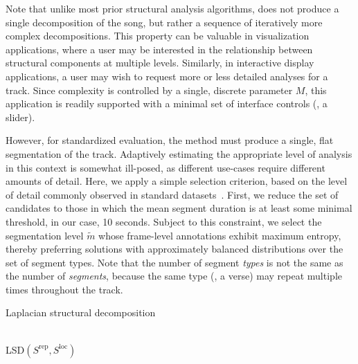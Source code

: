 \documentclass{article}
\begin{document}
Note that unlike most prior structural analysis algorithms,  does not produce a
single decomposition of the song, but rather a sequence of iteratively more complex 
decompositions.  This property can be valuable in visualization applications,
where a user may be interested in the relationship between structural components at
multiple levels.  Similarly, in interactive display applications, a user may wish to 
request more or less detailed analyses for a track.  Since complexity is controlled by
a single, discrete parameter $M$, this application is readily supported with a minimal
set of interface controls (\eg, a slider).

However, for standardized evaluation, the method must produce a single, flat
segmentation of the track.  Adaptively estimating the appropriate level of analysis in
this context is somewhat ill-posed, as different use-cases require different amounts of 
detail.  Here, we apply a simple selection criterion, based on the level of detail
commonly observed in standard datasets~\cite{harte2010towards,smith2011design}.  
First, we reduce the set of candidates to those in which the mean segment duration is 
at least some minimal threshold, in our case, 10 seconds.  
Subject to this constraint, we select the segmentation level $\tilde{m}$ whose 
frame-level annotations exhibit maximum entropy, thereby preferring solutions with 
approximately balanced distributions over the set of segment types.  Note that the
number of segment \emph{types} is not the same as the number of \emph{segments},
because the same type (\eg, a verse) may repeat multiple times throughout the track.




\begin{algorithm}[t]
\caption{Laplacian structural decomposition\label{lsd}}
\begin{algorithmic}[1]
\\
{\sc LSD}$(S^\text{rep}, S^\text{loc})$
\ENDFOR{}
\end{algorithmic}
\end{algorithm}
\end{document}
